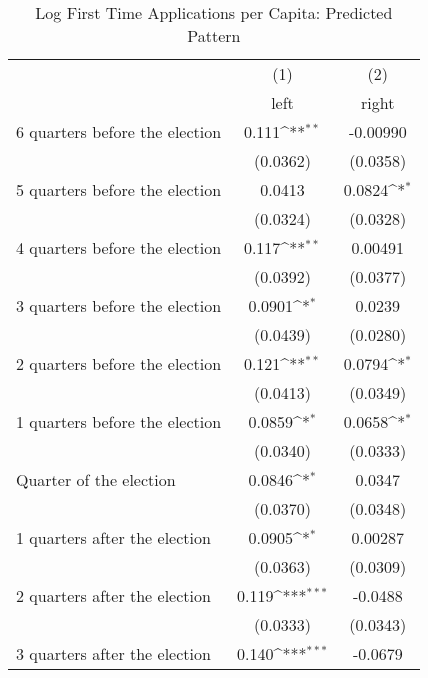 \begin{table}[htbp]\centering
\def\sym#1{\ifmmode^{#1}\else\(^{#1}\)\fi}
\caption{Log First Time Applications per Capita: Predicted Pattern}
\begin{tabular}{l*{2}{c}}
\hline\hline
                    &\multicolumn{1}{c}{(1)}&\multicolumn{1}{c}{(2)}\\
                    &\multicolumn{1}{c}{left}&\multicolumn{1}{c}{right}\\
\hline
 6 quarters before the election&       0.111\sym{**} &    -0.00990         \\
                    &    (0.0362)         &    (0.0358)         \\
[1em]
 5 quarters before the election&      0.0413         &      0.0824\sym{*}  \\
                    &    (0.0324)         &    (0.0328)         \\
[1em]
 4 quarters before the election&       0.117\sym{**} &     0.00491         \\
                    &    (0.0392)         &    (0.0377)         \\
[1em]
 3 quarters before the election&      0.0901\sym{*}  &      0.0239         \\
                    &    (0.0439)         &    (0.0280)         \\
[1em]
 2 quarters before the election&       0.121\sym{**} &      0.0794\sym{*}  \\
                    &    (0.0413)         &    (0.0349)         \\
[1em]
 1 quarters before the election&      0.0859\sym{*}  &      0.0658\sym{*}  \\
                    &    (0.0340)         &    (0.0333)         \\
[1em]
Quarter of the election&      0.0846\sym{*}  &      0.0347         \\
                    &    (0.0370)         &    (0.0348)         \\
[1em]
 1 quarters after the election&      0.0905\sym{*}  &     0.00287         \\
                    &    (0.0363)         &    (0.0309)         \\
[1em]
 2 quarters after the election&       0.119\sym{***}&     -0.0488         \\
                    &    (0.0333)         &    (0.0343)         \\
[1em]
 3 quarters after the election&       0.140\sym{***}&     -0.0679         \\

\end{tabular}
\end{table}
